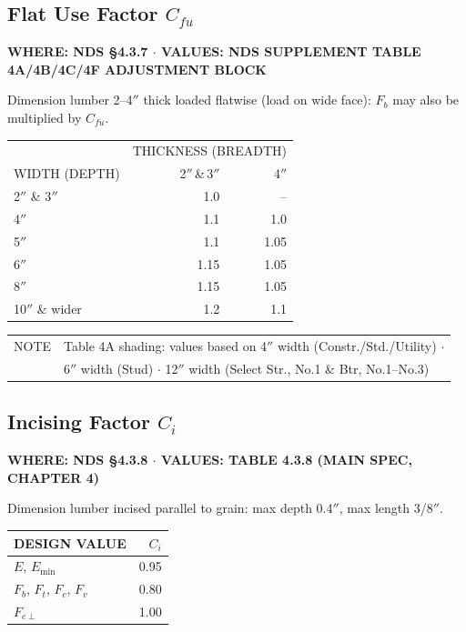 \documentclass[10pt]{article}
\begin{document}
\subsection{Flat Use Factor $C_{fu}$}

{\ttfamily\footnotesize\bfseries WHERE: NDS \S 4.3.7 $\cdot$ VALUES: NDS SUPPLEMENT TABLE 4A/4B/4C/4F ADJUSTMENT BLOCK}

\medskip
Dimension lumber 2--4$''$ thick loaded flatwise (load on wide face): $F_b$ may also be multiplied by $C_{fu}$.

\medskip
{\setlength{\arrayrulewidth}{0.5pt}\ttfamily\footnotesize
\begin{tabular}{@{}lrr@{}}
\hline
 & \multicolumn{2}{c}{{\scriptsize THICKNESS (BREADTH)}} \\
{\scriptsize WIDTH (DEPTH)} & {\scriptsize 2$''$\,\&\,3$''$} & {\scriptsize 4$''$} \\
\hline
2$''$ \& 3$''$   & 1.0  & --   \\
4$''$            & 1.1  & 1.0  \\
5$''$            & 1.1  & 1.05 \\
6$''$            & 1.15 & 1.05 \\
8$''$            & 1.15 & 1.05 \\
10$''$ \& wider  & 1.2  & 1.1  \\
\hline
\end{tabular}}

\smallskip
{\ttfamily\footnotesize
\begin{tabular}{@{}ll@{}}
NOTE & Table 4A shading: values based on 4$''$ width (Constr./Std./Utility) $\cdot$ \\
     & 6$''$ width (Stud) $\cdot$ 12$''$ width (Select Str., No.1 \& Btr, No.1--No.3) \\
\end{tabular}}

\subsection{Incising Factor $C_i$}

{\ttfamily\footnotesize\bfseries WHERE: NDS \S 4.3.8 $\cdot$ VALUES: TABLE 4.3.8 (MAIN SPEC, CHAPTER 4)}

\medskip
Dimension lumber incised parallel to grain: max depth 0.4$''$, max length 3/8$''$.

\medskip
{\setlength{\arrayrulewidth}{0.5pt}\ttfamily\footnotesize
\begin{tabular}{@{}lr@{}}
\hline
{\scriptsize DESIGN VALUE} & {\scriptsize $C_i$} \\
\hline
$E$, $E_{\min}$          & 0.95 \\
$F_b$, $F_t$, $F_c$, $F_v$ & 0.80 \\
$F_{c\perp}$             & 1.00 \\
\hline
\end{tabular}}
\end{document}
